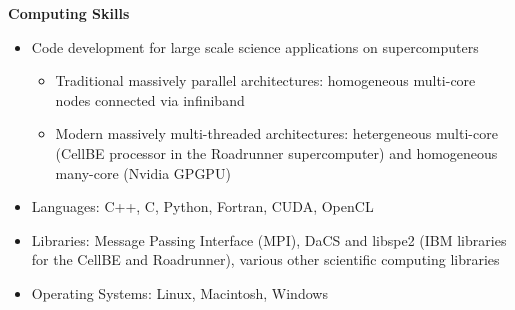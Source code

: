 \documentclass[12pt]{article}
\begin{document}
\noindent\textbf{Computing Skills}
\begin{itemize}
\item Code development for large scale science applications on
  supercomputers
  \begin{itemize}
  \item Traditional massively parallel architectures: homogeneous
    multi-core nodes connected via infiniband
  \item Modern massively multi-threaded architectures: hetergeneous
    multi-core (CellBE processor in the Roadrunner supercomputer)
    and homogeneous many-core (Nvidia GPGPU)
  \end{itemize}
\item Languages: C++, C, Python, Fortran, CUDA, OpenCL
\item Libraries: Message Passing Interface (MPI), DaCS and libspe2
  (IBM libraries for the CellBE and Roadrunner), various other
  scientific computing libraries
\item Operating Systems: Linux, Macintosh, Windows
\end{itemize}
\end{document}
